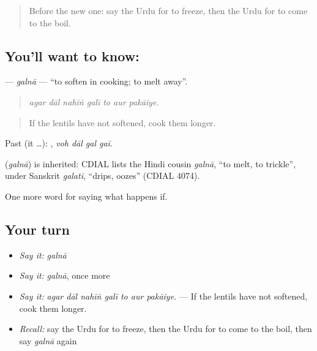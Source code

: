 \label{lesson:UR-C372-galna}



\begin{quote}
Before the new one: say the Urdu for to freeze, then the Urdu for to come to the boil.
\end{quote}

\subsection*{You'll want to know: }
\textbf{} — \emph{galnā} — \textquotedblleft{}to soften in cooking; to melt away\textquotedblright{}.

\begin{quote}
      
\end{quote}

\begin{quote}
\emph{agar dāl nahīṅ galī to aur pakāiye.}
\end{quote}

\begin{quote}
If the lentils have not softened, cook them longer.
\end{quote}

Past (it …):    , \emph{voh dāl gal gaī}.

\begin{cousinweb}
\textbf{} (\emph{galnā}) is inherited: CDIAL lists the Hindi cousin \emph{galnā}, \textquotedblleft{}to melt, to trickle\textquotedblright{}, under Sanskrit \emph{galati}, \textquotedblleft{}drips, oozes\textquotedblright{} (CDIAL 4074).
\end{cousinweb}

\begin{grammarlens}[title={What you've built}]
One more word for saying what happens if.
\end{grammarlens}

\subsection*{Your turn}
\begin{itemize}
\raggedright
  \item \emph{Say it:} \emph{galnā}
  \item \emph{Say it:} \emph{galnā}, once more
  \item \emph{Say it:} \emph{agar dāl nahīṅ galī to aur pakāiye.} — If the lentils have not softened, cook them longer.
  \item \emph{Recall:} say the Urdu for to freeze, then the Urdu for to come to the boil, then say \emph{galnā} again
\end{itemize}

